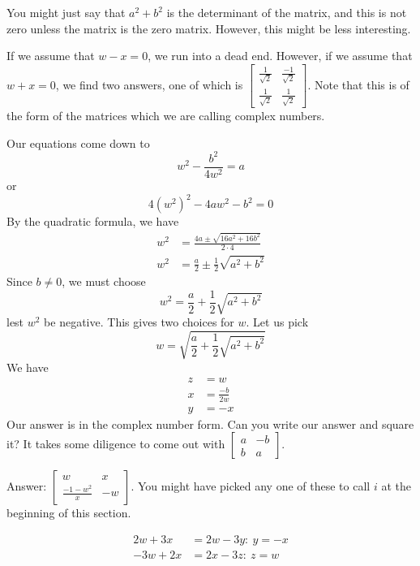 \documentclass{article}
\begin{document}
\begin{description}
    You might just say that $a^2 + b^2$ is the determinant of the matrix, and this is not zero unless the matrix is the zero matrix. However, this might be less interesting.

  \item[130.] If we assume that $w-x = 0$, we run into a dead end. However, if we assume that $w+x = 0$, we find two answers, one of which is $\begin{bmatrix} \frac{1}{\sqrt{2}} & \frac{-1}{\sqrt{2}}  \\  \frac{1}{\sqrt{2}} & \frac{1}{\sqrt{2}} \end{bmatrix}$. Note that this is of the form of the matrices which we are calling complex numbers.

  \item[131.] Our equations come down to
    \begin{equation*}
      w^2 - \frac{b^2}{4w^2} = a
    \end{equation*}
    or
    \begin{equation*}
      4({w^2})^2 - 4aw^2 - b^2 = 0
    \end{equation*}
    By the quadratic formula, we have
    \begin{align*}
      w^2 & = \frac{ 4a \pm \sqrt{16a^2 + 16b^2} }{2 \cdot 4} \\
      w^2 & = \frac{a}{2} \pm \frac{1}{2} \sqrt{a^2 + b^2}
    \end{align*}
    Since $b \neq 0$, we must choose
    \begin{equation*}
      w^2 = \frac{a}{2} + \frac{1}{2} \sqrt{a^2 + b^2}
    \end{equation*}
    lest $w^2$ be negative. This gives two choices for $w$. Let us pick
    \begin{equation*}
      w = \sqrt{ \frac{a}{2} + \frac{1}{2} \sqrt{a^2 + b^2} }
    \end{equation*}
    We have
    \begin{align*}
      z & = w \\
      x & = \frac{-b}{2w} \\
      y & = -x
    \end{align*}
    Our answer is in the complex number form. Can you write our answer and square it? It takes some diligence to come out with $\begin{bmatrix} a & -b \\ b & a \end{bmatrix}$.

  \item[132.] Answer: $\begin{bmatrix} w & x \\ \frac{-1-w^2}{x} & -w \end{bmatrix}$. You might have picked any one of these to call $i$ at the beginning of this section.

  \item[133.] 
    \begin{align*}
     2w + 3x & = 2w - 3y: \ y = -x \\
    -3w + 2x & = 2x - 3z: \ z = w
    \end{align*}

\end{description}
\end{document}
